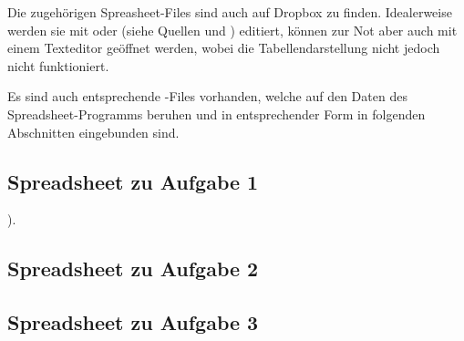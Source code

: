 Die    zugeh\"origen   Spreasheet-Files    sind    auch    auf   Dropbox    zu
finden. Idealerweise werden sie mit  oder  (siehe Quellen
\cite{ref:scim} und  \cite{ref:sc}) editiert, k\"onnen  zur Not aber  auch mit
einem Texteditor ge\"offnet werden, wobei die Tabellendarstellung nicht jedoch
nicht funktioniert.

Es sind auch entsprechende -Files  vorhanden, welche auf den Daten
des  Spreadsheet-Programms beruhen  und  in entsprechender  Form in  folgenden
Abschnitten eingebunden sind.


\subsection{Spreadsheet zu Aufgabe 1}
\label{appendix:aufgabe1}
).


\clearpage
\subsection{Spreadsheet zu Aufgabe 2}
\label{appendix:aufgabe2}


\clearpage
\subsection{Spreadsheet zu Aufgabe 3}
\label{appendix:aufgabe3}

